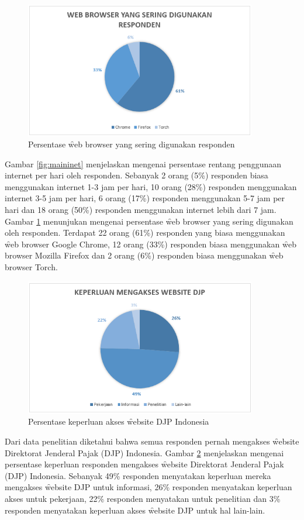 \begin{figure}
	\centering
	\includegraphics[width=0.9\textwidth,height=0.52\textwidth]
	{pics/webfavorit.PNG}
	\caption{Persentase \f{web browser} yang sering digunakan responden}
	\label{fig:browser}
\end{figure}
\noindent
Gambar \ref{fig:maininet} menjelaskan mengenai persentase rentang penggunaan internet per hari oleh responden. Sebanyak 2 orang (5\%) responden biasa menggunakan internet 1-3 jam per hari, 10 orang (28\%) responden menggunakan internet 3-5 jam per hari, 6 orang (17\%) responden menggunakan 5-7 jam per hari dan 18 orang (50\%) responden menggunakan internet lebih dari 7 jam. Gambar \ref{fig:browser} menunjukan mengenai persentase \f{web browser} yang sering digunakan oleh responden. Terdapat 22 orang (61\%) responden yang biasa menggunakan \f{web browser Google Chrome}, 12 orang (33\%) responden biasa menggunakan \f{web browser Mozilla Firefox} dan 2 orang (6\%) responden biasa menggunakan \f{web browser Torch}.
\begin{figure}
	\centering
	\includegraphics[width=0.9\textwidth,height=0.52\textwidth]
	{pics/keperluanAkses.PNG}
	\caption{Persentase keperluan akses \f{website} DJP Indonesia}
	\label{fig:akses}
\end{figure}
\noindent
Dari data penelitian diketahui bahwa semua responden pernah mengakses \f{website} Direktorat Jenderal Pajak (DJP) Indonesia. Gambar \ref{fig:akses} menjelaskan mengenai persentase keperluan responden mengakses \f{website} Direktorat Jenderal Pajak (DJP) Indonesia. Sebanyak 49\% responden menyatakan keperluan mereka mengakses \f{website} DJP untuk informasi, 26\% responden menyatakan keperluan akses untuk pekerjaan, 22\% responden menyatakan untuk penelitian dan 3\% responden menyatakan keperluan akses \f{website} DJP untuk hal lain-lain.
